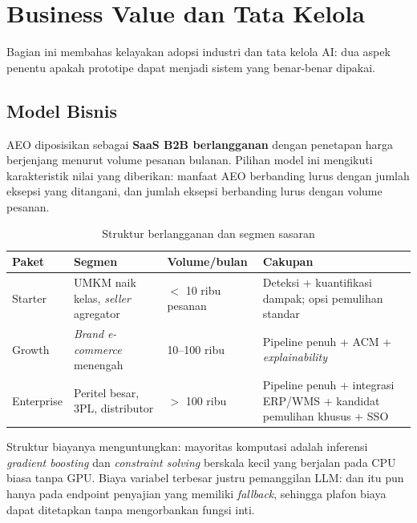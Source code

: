 \documentclass[12pt,a4paper]{article}
\begin{document}
\section{Business Value dan Tata Kelola}

Bagian ini membahas kelayakan adopsi industri dan tata kelola AI: dua aspek penentu apakah prototipe dapat menjadi sistem yang benar-benar dipakai.

\subsection{Model Bisnis}

AEO diposisikan sebagai \textbf{SaaS B2B berlangganan} dengan penetapan harga berjenjang menurut volume pesanan bulanan. Pilihan model ini mengikuti karakteristik nilai yang diberikan: manfaat AEO berbanding lurus dengan jumlah eksepsi yang ditangani, dan jumlah eksepsi berbanding lurus dengan volume pesanan.

\begin{table}[H]
  \centering\footnotesize
  \caption{Struktur berlangganan dan segmen sasaran}
  \begin{tabularx}{\textwidth}{L{2.1cm} L{2.9cm} L{2.6cm} Y}
    \toprule
    \textbf{Paket} & \textbf{Segmen} & \textbf{Volume/bulan} & \textbf{Cakupan} \\
    \midrule
    Starter
      & UMKM naik kelas, \textit{seller} agregator
      & $<$ 10 ribu pesanan
      & Deteksi + kuantifikasi dampak; opsi pemulihan standar \\[1.5pt]
    Growth
      & \textit{Brand} \textit{e-commerce} menengah
      & 10--100 ribu
      & Pipeline penuh + ACM + \textit{explainability} \\[1.5pt]
    Enterprise
      & Peritel besar, 3PL, distributor
      & $>$ 100 ribu
      & Pipeline penuh + integrasi ERP/WMS + kandidat pemulihan khusus + SSO \\
    \bottomrule
  \end{tabularx}
\end{table}

Struktur biayanya menguntungkan: mayoritas komputasi adalah inferensi \textit{gradient boosting} dan \textit{constraint solving} berskala kecil yang berjalan pada CPU biasa tanpa GPU. Biaya variabel terbesar justru pemanggilan LLM: dan itu pun hanya pada endpoint penyajian yang memiliki \textit{fallback}, sehingga plafon biaya dapat ditetapkan tanpa mengorbankan fungsi inti.
\end{document}
